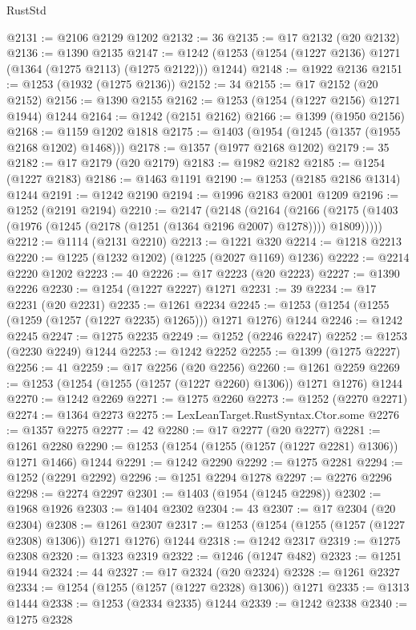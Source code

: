 \begin{lexlean}{RustStd}
\begin{coremodule}
@2131 := @2106 @2129 @1202
@2132 := 36
@2135 := @17 @2132 (@20 @2132)
@2136 := @1390 @2135
@2147 := @1242 (@1253 (@1254 (@1227 @2136) @1271 (@1364 (@1275 @2113) (@1275 @2122))) @1244)
@2148 := @1922 @2136
@2151 := @1253 (@1932 (@1275 @2136))
@2152 := 34
@2155 := @17 @2152 (@20 @2152)
@2156 := @1390 @2155
@2162 := @1253 (@1254 (@1227 @2156) @1271 @1944) @1244
@2164 := @1242 (@2151 @2162)
@2166 := @1399 (@1950 @2156)
@2168 := @1159 @1202 @1818
@2175 := @1403 (@1954 (@1245 (@1357 (@1955 @2168 @1202) @1468)))
@2178 := @1357 (@1977 @2168 @1202)
@2179 := 35
@2182 := @17 @2179 (@20 @2179)
@2183 := @1982 @2182
@2185 := @1254 (@1227 @2183)
@2186 := @1463 @1191
@2190 := @1253 (@2185 @2186 @1314) @1244
@2191 := @1242 @2190
@2194 := @1996 @2183 @2001 @1209
@2196 := @1252 (@2191 @2194)
@2210 := @2147
    (@2148
      (@2164
        (@2166 (@2175 (@1403 (@1976 (@1245 (@2178 (@1251 (@1364 @2196 @2007) @1278)))) @1809)))))
@2212 := @1114 (@2131 @2210)
@2213 := @1221 @320
@2214 := @1218 @2213
@2220 := @1225 (@1232 @1202) (@1225 (@2027 @1169) @1236)
@2222 := @2214 @2220 @1202
@2223 := 40
@2226 := @17 @2223 (@20 @2223)
@2227 := @1390 @2226
@2230 := @1254 (@1227 @2227) @1271
@2231 := 39
@2234 := @17 @2231 (@20 @2231)
@2235 := @1261 @2234
@2245 := @1253 (@1254 (@1255 (@1259 (@1257 (@1227 @2235) @1265))) @1271 @1276) @1244
@2246 := @1242 @2245
@2247 := @1275 @2235
@2249 := @1252 (@2246 @2247)
@2252 := @1253 (@2230 @2249) @1244
@2253 := @1242 @2252
@2255 := @1399 (@1275 @2227)
@2256 := 41
@2259 := @17 @2256 (@20 @2256)
@2260 := @1261 @2259
@2269 := @1253 (@1254 (@1255 (@1257 (@1227 @2260) @1306)) @1271 @1276) @1244
@2270 := @1242 @2269
@2271 := @1275 @2260
@2273 := @1252 (@2270 @2271)
@2274 := @1364 @2273
@2275 := LexLeanTarget.RustSyntax.Ctor.some
@2276 := @1357 @2275
@2277 := 42
@2280 := @17 @2277 (@20 @2277)
@2281 := @1261 @2280
@2290 := @1253 (@1254 (@1255 (@1257 (@1227 @2281) @1306)) @1271 @1466) @1244
@2291 := @1242 @2290
@2292 := @1275 @2281
@2294 := @1252 (@2291 @2292)
@2296 := @1251 @2294 @1278
@2297 := @2276 @2296
@2298 := @2274 @2297
@2301 := @1403 (@1954 (@1245 @2298))
@2302 := @1968 @1926
@2303 := @1404 @2302
@2304 := 43
@2307 := @17 @2304 (@20 @2304)
@2308 := @1261 @2307
@2317 := @1253 (@1254 (@1255 (@1257 (@1227 @2308) @1306)) @1271 @1276) @1244
@2318 := @1242 @2317
@2319 := @1275 @2308
@2320 := @1323 @2319
@2322 := @1246 (@1247 @482)
@2323 := @1251 @1944
@2324 := 44
@2327 := @17 @2324 (@20 @2324)
@2328 := @1261 @2327
@2334 := @1254 (@1255 (@1257 (@1227 @2328) @1306)) @1271
@2335 := @1313 @1444
@2338 := @1253 (@2334 @2335) @1244
@2339 := @1242 @2338
@2340 := @1275 @2328

\end{coremodule}
\end{lexlean}
